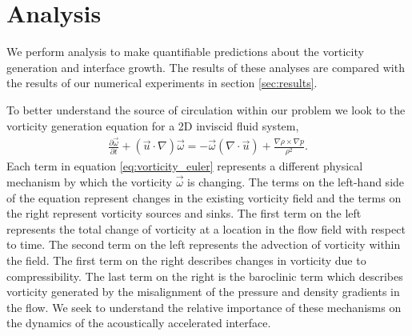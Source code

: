 \section{Analysis}%
\label{sec:analysis}%
We perform analysis to make quantifiable predictions about the
vorticity generation and interface growth. The results of these
analyses are compared with the results of our numerical experiments in
section \ref{sec:results}.

To better understand the source of circulation within our problem we
look to the vorticity generation equation for a 2D inviscid fluid
system,
\begin{align} \label{eq:vorticity_euler}
  \frac{\partial \vec{\omega}}{\partial t}+\left(\vec{u}\cdot\nabla\right)\vec{\omega} =%
  - \vec{\omega}\left(\nabla\cdot\vec{u}\right) + \frac{\nabla\rho\times\nabla p}{\rho^2}.%
\end{align}
Each term in equation \eqref{eq:vorticity_euler} represents a
different physical mechanism by which the vorticity $\vec{\omega}$ is
changing. The terms on the left-hand side of the equation represent
changes in the existing vorticity field and the terms on the right
represent vorticity sources and sinks. The first term on the left
represents the total change of vorticity at a location in the flow
field with respect to time. The second term on the left represents the
advection of vorticity within the field. The first term on the right
describes changes in vorticity due to compressibility. The last term
on the right is the baroclinic term which describes vorticity
generated by the misalignment of the pressure and density gradients in
the flow. We seek to understand the relative importance of these
mechanisms on the dynamics of the acoustically accelerated interface.

